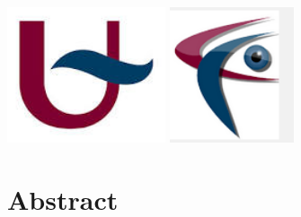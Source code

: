 \documentclass[12pt]{report}
\begin{document}
\begin{titlepage}




\includegraphics[height=4cm]{download.jpg}
\hspace{5 cm}
\includegraphics[height=4cm]{vlabsym.png}
 \\[1cm] %

 

\vfill %

\end{titlepage}
\tableofcontents
\newpage
\chapter*{Abstract}
\end{document}
